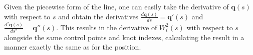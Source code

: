 Given the piecewise form of the line, one can easily take the derivative of $\textbf{q}(s)$ with respect to $s$ and obtain the derivatives $\frac{d\textbf{q}(s)}{ds} = \textbf{q}'(s)$ and $\frac{d^2\textbf{q}(s)}{ds^2} = \textbf{q}''(s)$. This results in the derivative of $W_{i}^{2}(s)$ with respect to $s$ alongside the same control points and knot indexes, calculating the result in a manner exactly the same as for the position.